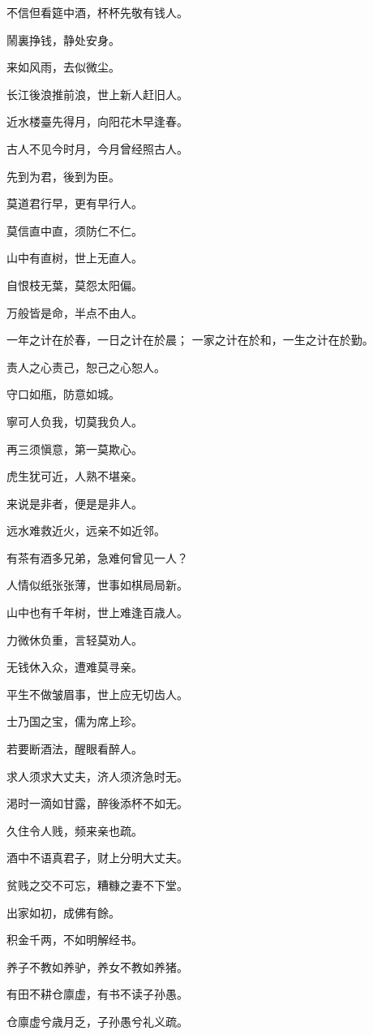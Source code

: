 \documentclass[12pt,oneside]{book}
\begin{document}
不信但看筵中酒，杯杯先敬有钱人。

鬧裏挣钱，静处安身。

来如风雨，去似微尘。

长江後浪推前浪，世上新人赶旧人。

近水楼臺先得月，向阳花木早逢春。

古人不见今时月，今月曾经照古人。

先到为君，後到为臣。

莫道君行早，更有早行人。

莫信直中直，须防仁不仁。

山中有直树，世上无直人。

自恨枝无葉，莫怨太阳偏。

万般皆是命，半点不由人。

一年之计在於春，一日之计在於晨；
一家之计在於和，一生之计在於勤。

责人之心责己，恕己之心恕人。

守口如甁，防意如城。

寧可人负我，切莫我负人。

再三须愼意，第一莫欺心。

虎生犹可近，人熟不堪亲。

来说是非者，便是是非人。

远水难救近火，远亲不如近邻。

有茶有酒多兄弟，急难何曾见一人？

人情似纸张张薄，世事如棋局局新。

山中也有千年树，世上难逢百歳人。

力微休负重，言轻莫劝人。

无钱休入众，遭难莫寻亲。

平生不做皱眉事，世上应无切齿人。

士乃国之宝，儒为席上珍。

若要断酒法，醒眼看醉人。

求人须求大丈夫，济人须济急时无。

渇时一滴如甘露，醉後添杯不如无。

久住令人贱，频来亲也疏。

酒中不语真君子，财上分明大丈夫。

贫贱之交不可忘，糟糠之妻不下堂。

出家如初，成佛有餘。

积金千两，不如明解经书。

养子不教如养驴，养女不教如养猪。

有田不耕仓廪虚，有书不读子孙愚。

仓廪虚兮歳月乏，子孙愚兮礼义疏。
\end{document}
